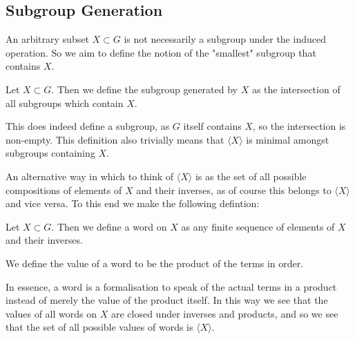 \documentclass[]{article}
\begin{document}
\subsection{Subgroup Generation}

An arbitrary subset $X \subset G$ is not necessarily a subgroup under the induced operation. So we aim to define the notion of the "smallest" subgroup that contains $X$.

\begin{defi} 
	Let $X \subset G$. Then we define the subgroup generated by $X$ as the intersection of all subgroups which contain $X$.
\end{defi}

This does indeed define a subgroup, as $G$ itself contains $X$, so the intersection is non-empty. This definition also trivially means that $\langle X \rangle $ is minimal amongst subgroups containing $X$. 

An alternative way in which to think of $\langle X \rangle $ is as the set of all possible compositions of elements of  $X$ and their inverses, as of course this belongs to $\langle X \rangle $ and vice versa. To this end we make the following defintion:

\begin{defi} [Word]
		Let $X \subset G$. Then we define a word on $X$ as any finite sequence of elements of $X$ and their inverses.

		We define the value of a word to be the product of the terms in order.
\end{defi}

In essence, a word is a formalisation to speak of the actual terms in a product instead of merely the value of the product itself. In this way we see that the values of all words on $X$ are closed under inverses and products, and so we see that the set of all possible values of words is $\langle X \rangle $.
\end{document}
